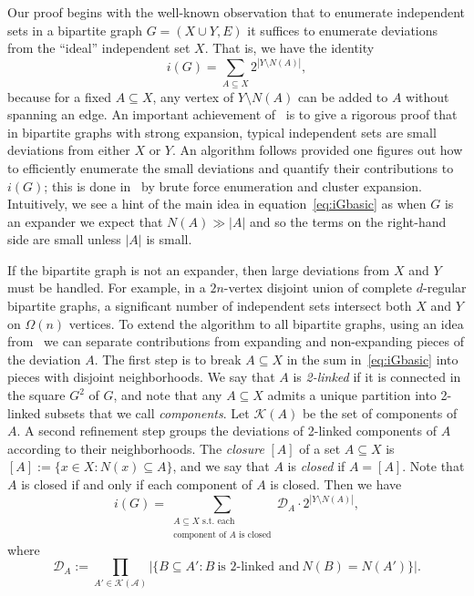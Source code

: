 \documentclass[11pt,letterpaper]{amsart}
\theoremstyle{definition}
\renewcommand{\subset}{\subseteq}
\begin{document}
Our proof begins with the well-known observation that to enumerate independent sets in a bipartite graph $G=(X\cup Y, E)$ it suffices to enumerate deviations from the ``ideal'' independent set $X$. 
That is, we have the identity
\begin{equation}\label{eq:iGbasic}
    i(G) = \sum_{A\subset X} 2^{|Y\setminus N(A)|},
\end{equation}
because for a fixed $A\subset X$, any vertex of $Y\setminus N(A)$ can be added to $A$ without spanning an edge.
An important achievement of~\cite{JKP19b} is to give a rigorous proof that in bipartite graphs with strong expansion, typical independent sets are small deviations from either $X$ or $Y$. An algorithm follows provided one figures out how to efficiently enumerate the small deviations and quantify their contributions to $i(G)$; this is done in~\cite{JKP19b} by brute force enumeration and cluster expansion. 
Intuitively, we see a hint of the main idea in equation~\eqref{eq:iGbasic} as when $G$ is an expander we expect that $N(A) \gg |A|$ and so the terms on the right-hand side are small unless $|A|$ is small. 

If the bipartite graph is not an expander, then large deviations from $X$ and $Y$ must be handled. For example, in a $2n$-vertex disjoint union of complete $d$-regular bipartite graphs, a significant number of independent sets intersect both $X$ and $Y$ on $\Omega(n)$ vertices. 
To extend the algorithm to all bipartite graphs, using an idea from~\cite{JPP22} we can separate contributions from expanding and non-expanding pieces of the deviation $A$.
The first step is to break $A\subset X$ in the sum in~\eqref{eq:iGbasic} into pieces with disjoint neighborhoods. 
We say that $A$ is \emph{2-linked} if it is connected in the square $G^2$ of $G$, and note that any $A\subset X$ admits a unique partition into 2-linked subsets that we call \emph{components}. Let $\mathcal{K}(A)$ be the set of components of $A$.
A second refinement step groups the deviations of 2-linked components of $A$ according to their neighborhoods. The \emph{closure} $[A]$ of a set $A\subset X$ is $[A] := \{x\in X : N(x)\subset A\}$, and we say that $A$ is \emph{closed} if $A=[A]$. 
Note that $A$ is closed if and only if each component of $A$ is closed.
Then we have 
\begin{equation}\label{eq:iGclosed}
    i(G) = \sum_{\substack{A\subset X\text{ s.t.\ each}\\\text{component of $A$ is closed}}} \mathcal{D}_A\cdot 2^{|Y\setminus N(A)|},
\end{equation}
where 
\[ \mathcal{D}_A := \prod_{A'\in \mathcal{K(A)}}\bigl| \{ B\subset A' : B~\text{is 2-linked and}~N(B)=N(A')\}\bigr| .\]
\end{document}
